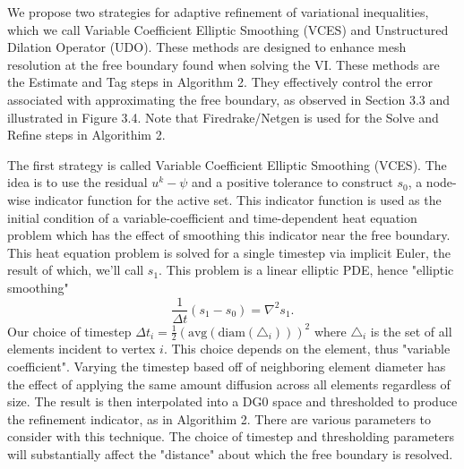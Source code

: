 \documentclass[]{interact}
\theoremstyle{plain}%
\theoremstyle{definition}
\theoremstyle{remark}
\begin{document}
We propose two strategies for adaptive refinement of variational inequalities, which we call Variable Coefficient Elliptic Smoothing (VCES) and Unstructured Dilation Operator (UDO). These methods are designed to enhance mesh resolution at the free boundary found when solving the VI. These methods are the Estimate and Tag steps in Algorithm 2. They effectively control the error associated with approximating the free boundary, as observed in Section 3.3 and illustrated in Figure 3.4. Note that Firedrake/Netgen is used for the Solve and Refine steps in Algorithim 2.

The first strategy is called Variable Coefficient Elliptic Smoothing (VCES). The idea is to use the residual $u^k - \psi$ and a positive tolerance to construct $s_0$, a node-wise indicator function for the active set. This indicator function is used as the initial condition of a variable-coefficient and time-dependent heat equation problem which has the effect of smoothing this indicator near the free boundary. This heat equation problem is solved for a single timestep via implicit Euler, the result of which, we'll call $s_1$. This problem is a linear elliptic PDE, hence "elliptic smoothing"
\begin{equation}
  \frac{1}{\Delta t}(s_1 - s_0) = \nabla^2 s_1.
\end{equation}
Our choice of timestep $\Delta t_i = \frac{1}{2}(\text{avg}(\text{diam}(\triangle_i)))^2$ where $\triangle_i$ is the set of all elements incident to vertex $i$. This choice depends on the element, thus "variable coefficient". Varying the timestep based off of neighboring element diameter has the effect of applying the same amount diffusion across all elements regardless of size. The result is then interpolated into a DG0 space and thresholded to produce the refinement indicator, as in Algorithim 2. There are various parameters to consider with this technique. The choice of timestep and thresholding parameters will substantially affect the "distance" about which the free boundary is resolved. 
\end{document}
